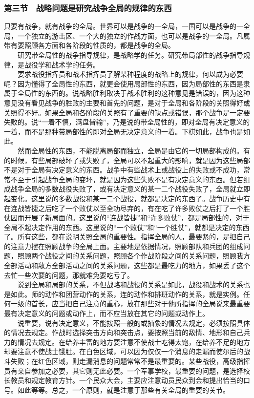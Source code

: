 \documentclass[cn,11pt,chinese]{elegantbook}
\def\myformat#1{\hfil\hfil #1}
\begin{document}
\subsubsection*{\myformat{第三节　战略问题是研究战争全局的规律的东西}}
只要有战争，就有战争的全局。世界可以是战争的一全局，一国可以是战争的一全局，一个独立的游击区、一个大的独立的作战方面，也可以是战争的一全局。凡属带有要照顾各方面和各阶段的性质的，都是战争的全局。\\
　　研究带全局性的战争指导规律，是战略学的任务。研究带局部性的战争指导规律，是战役学和战术学的任务。\\
　　要求战役指挥员和战术指挥员了解某种程度的战略上的规律，何以成为必要呢？因为懂得了全局性的东西，就更会使用局部性的东西，因为局部性的东西是隶属于全局性的东西的。说战略胜利取决于战术胜利的这种意见是错误的，因为这种意见没有看见战争的胜败的主要和首先的问题，是对于全局和各阶段的关照得好或关照得不好。如果全局和各阶段的关照有了重要的缺点或错误，那个战争是一定要失败的。说“一着不慎，满盘皆输”，乃是说的带全局性的，即对全局有决定意义的一着，而不是那种带局部性的即对全局无决定意义的一着。下棋如此，战争也是如此。\\
　　然而全局性的东西，不能脱离局部而独立，全局是由它的一切局部构成的。有的时候，有些局部破坏了或失败了，全局可以不起重大的影响，就是因为这些局部不是对于全局有决定意义的东西。战争中有些战术上或战役上的失败或不成功，常常不至于引起战争全局的变坏，就是因为这些失败不是有决定意义的东西。但若组成战争全局的多数战役失败了，或有决定意义的某一二个战役失败了，全局就立即起变化。这里说的多数战役和某一二个战役，就都是决定的东西了。战争历史中有在连战皆捷之后吃了一个败仗以至全功尽弃的，有在吃了许多败仗之后打了一个胜仗因而开展了新局面的。这里说的“连战皆捷”和“许多败仗”，都是局部性的，对于全局不起决定作用的东西。这里说的“一个败仗”和“一个胜仗”，就都是决定的东西了。所有这些，都在说明关照全局的重要性。指挥全局的人，最要紧的，是把自己的注意力摆在照顾战争的全局上面。主要地是依据情况，照顾部队和兵团的组成问题，照顾两个战役之间的关系问题，照顾各个作战阶段之间的关系问题，照顾我方全部活动和敌方全部活动之间的关系问题，这些都是最吃力的地方，如果丢了这个去忙一些次要的问题，那就难免要吃亏了。\\
　　说到全局和局部的关系，不但战略和战役的关系是如此，战役和战术的关系也是如此。师的动作和团营动作的关系，连的动作和排班动作的关系，就是实例。任何一级的首长，应当把自己注意的重心，放在那些对于他所指挥的全局说来最重要最有决定意义的问题或动作上，而不应当放在其它的问题或动作上。\\
　　说重要，说有决定意义，不能按照一般的或抽象的情况去规定，必须按照具体的情况去规定。作战时选择突击方向和突击点，要按照当前的敌情、地形和自己兵力的情况去规定。在给养丰富的地方要注意不使战士吃得太饱，在给养不足的地方却要注意不使战士饿肚。在白色区域，可以因为仅仅一个消息的走漏而使尔后的战斗失败；在红色区域，则走漏消息的问题常常不是最重要的。某些战役，高级指挥员有亲自参加之必要，其它则无此必要。一个军事学校，最重要的问题，是选择校长教员和规定教育方针。一个民众大会，主要应注意动员民众到会和提出恰当的口号。如此等等。总之，一个原则，就是注意于那些有关全局的重要的关节。\\
\end{document}
